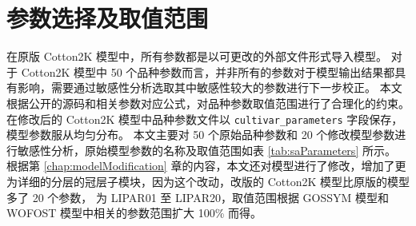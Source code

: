 \section{参数选择及取值范围}
在原版 Cotton2K 模型中，所有参数都是以可更改的外部文件形式导入模型。%
对于 Cotton2K 模型中 50 个品种参数而言，并非所有的参数对于模型输出结果都具有影响，需要通过敏感性分析选取其中敏感性较大的参数进行下一步校正。%
本文根据公开的源码和相关参数对应公式，对品种参数取值范围进行了合理化的约束。%
在修改后的 Cotton2K 模型中品种参数文件以 \texttt{cultivar\_parameters} 字段保存，模型参数服从均匀分布。%
本文主要对 50 个原始品种参数和 20 个修改模型参数进行敏感性分析，原始模型参数的名称及取值范围如表 \ref{tab:saParameters} 所示。%
根据第 \ref{chap:modelModification} 章的内容，本文还对模型进行了修改，增加了更为详细的分层的冠层子模块，因为这个改动，改版的 Cotton2K 模型比原版的模型多了 20 个参数，%
为 LIPAR01 至 LIPAR20，取值范围根据 GOSSYM 模型和 WOFOST 模型中相关的参数范围扩大 100\% 而得。
